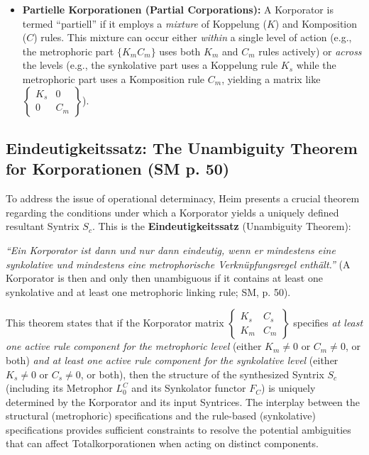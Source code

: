 \documentclass[
    12pt,              %
    a4paper,           %
    headings=normal,   %
    twoside=true,      %
    BCOR=8mm,          %
]{scrbook}
\newcommand{\q}[1]{\enquote{#1}}
\newcommand{\korporatoroperator}{\begin{Bmatrix} K_s & C_s \\ K_m & C_m \end{Bmatrix}}
\begin{document}
\begin{itemize}
    \item   \textbf{Partielle Korporationen (Partial Corporations):} A Korporator is termed \q{partiell} if it employs a \textit{mixture} of Koppelung (\(K\)) and Komposition (\(C\)) rules. This mixture can occur either \textit{within} a single level of action (e.g., the metrophoric part \(\{K_m C_m\}\) uses both \(K_m\) and \(C_m\) rules actively) or \textit{across} the levels (e.g., the synkolative part uses a Koppelung rule \(K_s\) while the metrophoric part uses a Komposition rule \(C_m\), yielding a matrix like \( \begin{Bmatrix} K_s & 0 \\ 0 & C_m \end{Bmatrix} \)).
\end{itemize}

\subsection{Eindeutigkeitssatz: The Unambiguity Theorem for Korporationen (SM p. 50)}
\label{sec:ch3_eindeutigkeitssatz} 

To address the issue of operational determinacy, Heim presents a crucial theorem regarding the conditions under which a Korporator yields a uniquely defined resultant Syntrix \(S_c\). This is the \textbf{Eindeutigkeitssatz} (Unambiguity Theorem):
\begin{displayquote}
    \textit{\q{Ein Korporator ist dann und nur dann eindeutig, wenn er mindestens eine synkolative und mindestens eine metrophorische Verknüpfungsregel enthält.}} (A Korporator is then and only then unambiguous if it contains at least one synkolative and at least one metrophoric linking rule; SM, p. 50).
\end{displayquote}
This theorem states that if the Korporator matrix \(\korporatoroperator\) specifies \textit{at least one active rule component for the metrophoric level} (either \(K_m \neq 0\) or \(C_m \neq 0\), or both) \textit{and at least one active rule component for the synkolative level} (either \(K_s \neq 0\) or \(C_s \neq 0\), or both), then the structure of the synthesized Syntrix \(S_c\) (including its Metrophor \(L_0^C\) and its Synkolator functor \(F_C\)) is uniquely determined by the Korporator and its input Syntrices. The interplay between the structural (metrophoric) specifications and the rule-based (synkolative) specifications provides sufficient constraints to resolve the potential ambiguities that can affect Totalkorporationen when acting on distinct components.
\end{document}
